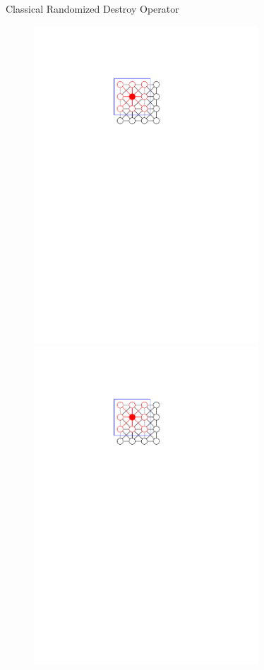 \documentclass[aspectratio=1610]{beamer}
\begin{document}
\begin{frame}{Classical Randomized Destroy Operator}
\begin{figure}
\begin{overprint}
			\centering\includegraphics[width=0.75\textwidth, page=14]{figures/graphics.pdf}
			\onslide<3>\centering\includegraphics[width=0.75\textwidth, page=15]{figures/graphics.pdf}

\end{overprint}
\end{figure}
\end{frame}
\end{document}

